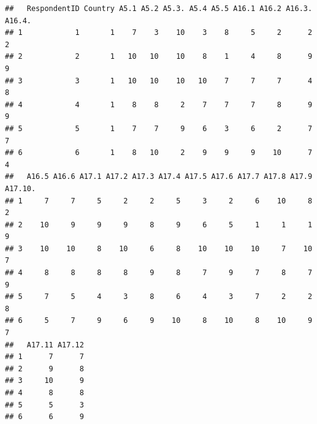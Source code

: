 \documentclass[
]{article}
\newenvironment{Shaded}{\begin{snugshade}}{\end{snugshade}}
\newcommand{\CommentTok}[1]{\textcolor[rgb]{0.56,0.35,0.01}{\textit{#1}}}
\newcommand{\FloatTok}[1]{\textcolor[rgb]{0.00,0.00,0.81}{#1}}
\newcommand{\FunctionTok}[1]{\textcolor[rgb]{0.13,0.29,0.53}{\textbf{#1}}}
\newcommand{\NormalTok}[1]{#1}
\newcommand{\OtherTok}[1]{\textcolor[rgb]{0.56,0.35,0.01}{#1}}
\newcommand{\SpecialCharTok}[1]{\textcolor[rgb]{0.81,0.36,0.00}{\textbf{#1}}}
\begin{document}
\begin{Shaded}
\end{Shaded}

\begin{verbatim}
##   RespondentID Country A5.1 A5.2 A5.3. A5.4 A5.5 A16.1 A16.2 A16.3. A16.4.
## 1            1       1    7    3    10    3    8     5     2      2      2
## 2            2       1   10   10    10    8    1     4     8      9      9
## 3            3       1   10   10    10   10    7     7     7      4      8
## 4            4       1    8    8     2    7    7     7     8      9      9
## 5            5       1    7    7     9    6    3     6     2      7      7
## 6            6       1    8   10     2    9    9     9    10      7      4
##   A16.5 A16.6 A17.1 A17.2 A17.3 A17.4 A17.5 A17.6 A17.7 A17.8 A17.9 A17.10.
## 1     7     7     5     2     2     5     3     2     6    10     8       2
## 2    10     9     9     9     8     9     6     5     1     1     1       9
## 3    10    10     8    10     6     8    10    10    10     7    10       7
## 4     8     8     8     8     9     8     7     9     7     8     7       9
## 5     7     5     4     3     8     6     4     3     7     2     2       8
## 6     5     7     9     6     9    10     8    10     8    10     9       7
##   A17.11 A17.12
## 1      7      7
## 2      9      8
## 3     10      9
## 4      8      8
## 5      5      3
## 6      6      9
\end{verbatim}
\end{document}
